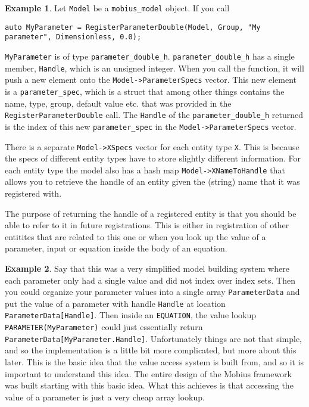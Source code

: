 \documentclass[11pt]{article}
\theoremstyle{definition}
\newtheorem{myexample}{Example}
\newenvironment{example}%
  {\begin{lrbox}{\examplebox}%
   \begin{minipage}{\dimexpr\linewidth-2\fboxsep}
   \begin{myexample}}%
  {\end{myexample}%
   \end{minipage}%
   \end{lrbox}%
   \begin{trivlist}
     \item[]\colorbox{silver}{\usebox\examplebox}
   \end{trivlist}}
\begin{document}
\begin{example}
Let {\tt Model} be a {\tt mobius\_model} object. If you call
\begin{lstlisting}[style=mycpp]
auto MyParameter = RegisterParameterDouble(Model, Group, "My parameter", Dimensionless, 0.0);
\end{lstlisting}
{\tt MyParameter} is of type {\tt parameter\_double\_h}. {\tt parameter\_double\_h} has a single member, {\tt Handle}, which is an unsigned integer. When you call the function, it will push a new element onto the {\tt Model->ParameterSpecs} vector. This new element is a {\tt parameter\_spec}, which is a struct that among other things contains the name, type, group, default value etc. that was provided in the {\tt RegisterParameterDouble} call. The {\tt Handle} of the {\tt parameter\_double\_h} returned is the index of this new {\tt parameter\_spec} in the {\tt Model->ParameterSpecs} vector.
\end{example}

There is a separate {\tt Model->XSpecs} vector for each entity type {\tt X}. This is because the specs of different entity types have to store slightly different information. For each entity type the model also has a hash map {\tt Model->XNameToHandle} that allows you to retrieve the handle of an entity given the (string) name that it was registered with.

The purpose of returning the handle of a registered entity is that you should be able to refer to it in future registrations. This is either in registration of other entitites that are related to this one or when you look up the value of a parameter, input or equation inside the body of an equation.

\begin{example}
Say that this was a very simplified model building system where each parameter only had a single value and did not index over index sets. Then you could organize your parameter values into a single array {\tt ParameterData} and put the value of a parameter with handle {\tt Handle} at location {\tt ParameterData[Handle]}. Then inside an {\tt EQUATION}, the value lookup {\tt PARAMETER(MyParameter)} could just essentially return {\tt ParameterData[MyParameter.Handle]}. Unfortunately things are not that simple, and so the implementation is a little bit more complicated, but more about this later. This is the basic idea that the value access system is built from, and so it is important to understand this idea. The entire design of the Mobius framework was built starting with this basic idea. What this achieves is that accessing the value of a parameter is just a very cheap array lookup.
\end{example}
\end{document}

